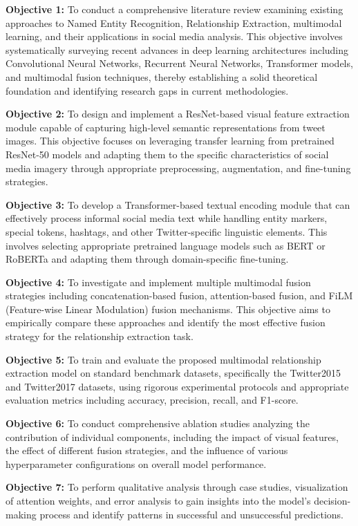 \documentclass[12pt,a4paper]{report}
\begin{document}
\textbf{Objective 1:} To conduct a comprehensive literature review examining existing approaches to Named Entity Recognition, Relationship Extraction, multimodal learning, and their applications in social media analysis. This objective involves systematically surveying recent advances in deep learning architectures including Convolutional Neural Networks, Recurrent Neural Networks, Transformer models, and multimodal fusion techniques, thereby establishing a solid theoretical foundation and identifying research gaps in current methodologies.

\textbf{Objective 2:} To design and implement a ResNet-based visual feature extraction module capable of capturing high-level semantic representations from tweet images. This objective focuses on leveraging transfer learning from pretrained ResNet-50 models and adapting them to the specific characteristics of social media imagery through appropriate preprocessing, augmentation, and fine-tuning strategies.

\textbf{Objective 3:} To develop a Transformer-based textual encoding module that can effectively process informal social media text while handling entity markers, special tokens, hashtags, and other Twitter-specific linguistic elements. This involves selecting appropriate pretrained language models such as BERT or RoBERTa and adapting them through domain-specific fine-tuning.

\textbf{Objective 4:} To investigate and implement multiple multimodal fusion strategies including concatenation-based fusion, attention-based fusion, and FiLM (Feature-wise Linear Modulation) fusion mechanisms. This objective aims to empirically compare these approaches and identify the most effective fusion strategy for the relationship extraction task.

\textbf{Objective 5:} To train and evaluate the proposed multimodal relationship extraction model on standard benchmark datasets, specifically the Twitter2015 and Twitter2017 datasets, using rigorous experimental protocols and appropriate evaluation metrics including accuracy, precision, recall, and F1-score.

\textbf{Objective 6:} To conduct comprehensive ablation studies analyzing the contribution of individual components, including the impact of visual features, the effect of different fusion strategies, and the influence of various hyperparameter configurations on overall model performance.

\textbf{Objective 7:} To perform qualitative analysis through case studies, visualization of attention weights, and error analysis to gain insights into the model's decision-making process and identify patterns in successful and unsuccessful predictions.
\end{document}
